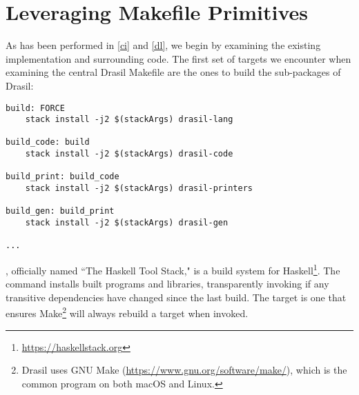 \section{Leveraging Makefile Primitives}\label{bsRefactor}

%
%
%
%
As has been performed in \autoref{ci} and \autoref{dl}, we begin by examining the existing implementation and surrounding code. The first set of targets we encounter when examining the central Drasil Makefile are the ones to build the sub-packages of Drasil:

\begin{tcolorbox}
\begin{verbatim}
build: FORCE
	stack install -j2 $(stackArgs) drasil-lang

build_code: build
	stack install -j2 $(stackArgs) drasil-code

build_print: build_code
	stack install -j2 $(stackArgs) drasil-printers

build_gen: build_print
	stack install -j2 $(stackArgs) drasil-gen

...
\end{verbatim}
\end{tcolorbox}

, officially named ``The Haskell Tool Stack," is a build system for Haskell\footnote{\url{https://haskellstack.org}}. The command  installs built programs and libraries, transparently invoking  if any transitive dependencies have \linebreak changed since the last build. The  target is one that ensures Make\footnote{Drasil uses GNU Make (\url{https://www.gnu.org/software/make/}), which is the common  program on both macOS and Linux.} will always rebuild a target when invoked.

